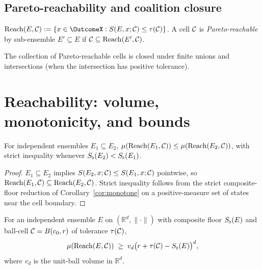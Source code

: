 \subsection{Pareto-reachability and coalition closure}

\begin{definition}\label{def:reach}
$\Reach(E,\Cell):=\{x\in\OutcomeX : S(E,x;\Cell)\le\tau(\Cell)\}$.
A cell $\mathcal{C}$ is \emph{Pareto-reachable} by sub-ensemble $E'\subseteq E$
if $\mathcal{C}\subseteq\operatorname{Reach}(E',\mathcal{C})$.
\end{definition}

\begin{theorem}\label{thm:coalition}
The collection of Pareto-reachable cells is closed under finite unions and
intersections (when the intersection has positive tolerance).
\end{theorem}

\section{Reachability: volume, monotonicity, and bounds}
\label{sec:ch03-reach}

\begin{theorem}\label{thm:rvol-mono}
For independent ensembles $E_1\subseteq E_2$,
$\mu(\operatorname{Reach}(E_1,\mathcal{C}))\le\mu(\operatorname{Reach}(E_2,\mathcal{C}))$, with strict inequality
whenever $S_{\flat}(E_2)<S_{\flat}(E_1)$.
\end{theorem}

\begin{proof}
$E_1\subseteq E_2$ implies $S(E_2,x;\mathcal{C})\le S(E_1,x;\mathcal{C})$ pointwise,
so $\operatorname{Reach}(E_1,\mathcal{C})\subseteq\operatorname{Reach}(E_2,\mathcal{C})$. Strict inequality
follows from the strict composite-floor reduction of
Corollary~\ref{cor:monotone} on a positive-measure set of states near
the cell boundary.
\end{proof}

\begin{theorem}\label{thm:rlb}
For an independent ensemble $E$ on $(\mathbb{R}^d,\|\cdot\|)$ with composite
floor $S_{\flat}(E)$ and ball-cell $\mathcal{C}=B(c_0,r)$ of tolerance
$\tau(\mathcal{C})$,
\[
\mu(\operatorname{Reach}(E,\mathcal{C}))
 \;\ge\; v_d\bigl(r+\tau(\mathcal{C})-S_{\flat}(E)\bigr)^d,
\]
where $v_d$ is the unit-ball volume in $\mathbb{R}^d$.
\end{theorem}


